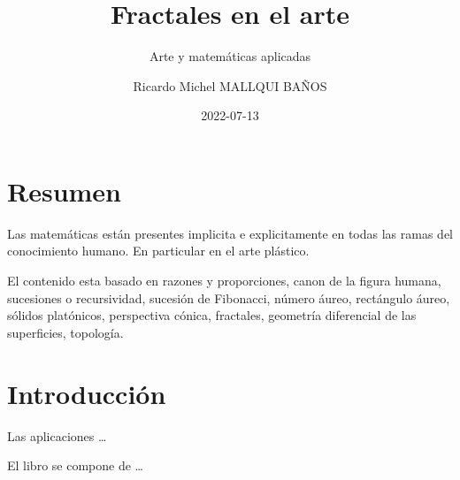 \documentclass[
  11pt,
]{krantz}
\title{Fractales en el arte}
\subtitle{Arte y matemáticas aplicadas}
\author{Ricardo Michel MALLQUI BAÑOS}
\date{2022-07-13}
\theoremstyle{definition}
\theoremstyle{definition}
\theoremstyle{definition}
\theoremstyle{definition}
\theoremstyle{remark}
\begin{document}
\maketitle

\thispagestyle{empty}
\begin{center}
\end{center}


{
\hypersetup{linkcolor=}
\setcounter{tocdepth}{2}
\tableofcontents
}
\listoftables
\listoffigures
\newcommand{\N}{\mathbb{N}}
\newcommand{\R}{\mathbb{R}}
\newcommand{\CC}{\mathbb{C}}
\newcommand{\I}{\mathbb{I}}
\newcommand{\f}{\mathbb{f}}
\newcommand{\X}{\mathbb{X}}
\newcommand{\D}{\mathbb{D}}
\newcommand{\Z}{\mathbb{Z}}
\newcommand{\Q}{\mathbb{Q}}
\newcommand{\norm}[1]{\left\Vert#1\right\Vert}
\newcommand{\abs}[1]{\left\vert#1\right\vert}
\newcommand{\set}[1]{\left\{#1\right\}}
\newcommand{\seq}[1]{\left<#1\right>}
\newcommand{\co}[1]{\left[#1\right]}
\newcommand{\cc}[1]{\left(#1\right)}
\newcommand{\J}{\mathcal{J}}
\newcommand{\K}{\mathcal{K}}
\newcommand{\M}{\mathcal{M}}
\newcommand{\F}{\mathcal{F}}

\hypertarget{resumen}{%
\chapter*{Resumen}\label{resumen}}


Las matemáticas están presentes implicita e explicitamente en todas las ramas del conocimiento humano. En particular en el arte plástico.

El contenido esta basado en razones y proporciones, canon de la figura humana, sucesiones o recursividad, sucesión de Fibonacci, número áureo, rectángulo áureo, sólidos platónicos, perspectiva cónica, fractales, geometría diferencial de las superficies, topología.

\hypertarget{introducciuxf3n}{%
\chapter*{Introducción}\label{introducciuxf3n}}


Las aplicaciones \ldots{}

El libro se compone de \ldots{}

\mainmatter
\end{document}
